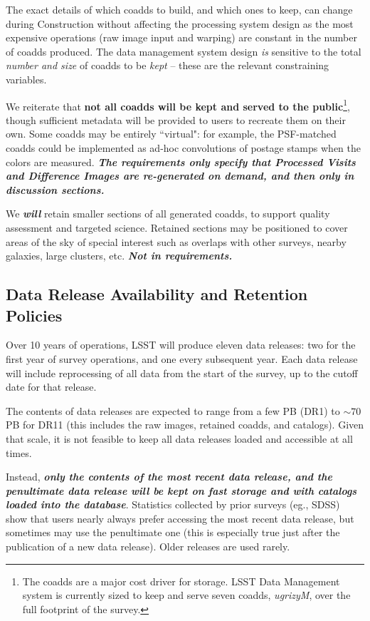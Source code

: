 \documentclass[12pt]{article}
\newcommand{\annotate}[1]{{\color{magenta}\large\textbf{\emph{#1}}}}
\newcommand{\req}[1]{\marginpar{\tiny #1}}
\newcommand{\dmreq}[1]{\req{DMS-REQ-#1}}
\begin{document}
The exact details of which coadds to build, and which ones to keep, can change during Construction without affecting the processing system design as the most expensive operations (raw image input and warping) are constant in the number of coadds produced. The data management system design {\em is} sensitive to the total {\em number and size} of coadds to be {\em kept} -- these are the relevant constraining variables.

We reiterate that {\bf not all coadds will be kept and served to the public}\footnote{The coadds are a major cost driver for storage. LSST Data Management system is currently sized to keep and serve seven coadds, {\em ugrizyM}, over the full footprint of the survey.}, though sufficient metadata will be provided to users to recreate them on their own. Some coadds may be entirely ``virtual": for example, the PSF-matched coadds could be implemented as ad-hoc convolutions of postage stamps when the colors are measured. \annotate{The requirements only specify that Processed Visits and Difference Images are re-generated on demand, and then only in discussion sections.}

We {\em \bf will} retain smaller sections of all generated coadds, to support quality assessment and targeted science. Retained sections may be positioned to cover areas of the sky of special interest such as overlaps with other surveys, nearby galaxies, large clusters, etc. \annotate{Not in requirements.}

\subsection{Data Release Availability and Retention Policies}
\label{sec:retention}

Over 10 years of operations, LSST will produce eleven data releases: two for the first year of survey operations, and one every subsequent year. Each data release will include reprocessing of all data from the start of the survey, up to the cutoff date for that release.

The contents of data releases are expected to range from a few PB (DR1) to $\sim 70$ PB for DR11 (this includes the raw images, retained coadds, and catalogs). Given that scale, it is not feasible to keep all data releases loaded and accessible at all times.

Instead, {\bf \em only the contents of the most recent data release, and the penultimate data release will be kept on fast storage and with catalogs loaded into the database}. \dmreq{0313} Statistics collected by prior surveys (eg., SDSS) show that users nearly always prefer accessing the most recent data release, but sometimes may use the penultimate one (this is especially true just after the publication of a new data release). Older releases are used rarely.
\end{document}
